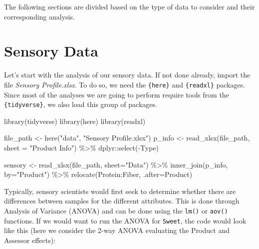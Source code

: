 \documentclass[
]{book}
\newenvironment{Shaded}{\begin{snugshade}}{\end{snugshade}}
\newcommand{\AttributeTok}[1]{\textcolor[rgb]{0.77,0.63,0.00}{#1}}
\newcommand{\FunctionTok}[1]{\textcolor[rgb]{0.00,0.00,0.00}{#1}}
\newcommand{\NormalTok}[1]{#1}
\newcommand{\OtherTok}[1]{\textcolor[rgb]{0.56,0.35,0.01}{#1}}
\newcommand{\SpecialCharTok}[1]{\textcolor[rgb]{0.00,0.00,0.00}{#1}}
\newcommand{\StringTok}[1]{\textcolor[rgb]{0.31,0.60,0.02}{#1}}
\begin{document}
The following sections are divided based on the type of data to consider and their corresponding analysis.

\hypertarget{sensory-data}{%
\section{Sensory Data}\label{sensory-data}}

Let's start with the analysis of our sensory data. If not done already, import the file \emph{Sensory Profile.xlsx}.
To do so, we need the \texttt{\{here\}} and \texttt{\{readxl\}} packages. Since most of the analyses we are going to perform require tools from the \texttt{\{tidyverse\}}, we also load this group of packages.

\begin{Shaded}
\begin{Highlighting}[]
\FunctionTok{library}\NormalTok{(tidyverse)}
\FunctionTok{library}\NormalTok{(here)}
\FunctionTok{library}\NormalTok{(readxl)}

\NormalTok{file\_path }\OtherTok{\textless{}{-}} \FunctionTok{here}\NormalTok{(}\StringTok{"data"}\NormalTok{, }\StringTok{"Sensory Profile.xlsx"}\NormalTok{) }
\NormalTok{p\_info }\OtherTok{\textless{}{-}} \FunctionTok{read\_xlsx}\NormalTok{(file\_path, }\AttributeTok{sheet =} \StringTok{"Product Info"}\NormalTok{) }\SpecialCharTok{\%\textgreater{}\%} 
\NormalTok{  dplyr}\SpecialCharTok{::}\FunctionTok{select}\NormalTok{(}\SpecialCharTok{{-}}\NormalTok{Type)}

\NormalTok{sensory }\OtherTok{\textless{}{-}} \FunctionTok{read\_xlsx}\NormalTok{(file\_path, }\AttributeTok{sheet=}\StringTok{"Data"}\NormalTok{) }\SpecialCharTok{\%\textgreater{}\%} 
  \FunctionTok{inner\_join}\NormalTok{(p\_info, }\AttributeTok{by=}\StringTok{"Product"}\NormalTok{) }\SpecialCharTok{\%\textgreater{}\%} 
  \FunctionTok{relocate}\NormalTok{(Protein}\SpecialCharTok{:}\NormalTok{Fiber, }\AttributeTok{.after=}\NormalTok{Product)}
\end{Highlighting}
\end{Shaded}

Typically, sensory scientists would first seek to determine whether there are differences between samples for the different attributes. This is done through Analysis of Variance (ANOVA) and can be done using the \texttt{lm()} or \texttt{aov()} functions.
If we would want to run the ANOVA for \texttt{Sweet}, the code would look like this (here we consider the 2-way ANOVA evaluating the Product and Assessor effects):
\end{document}
